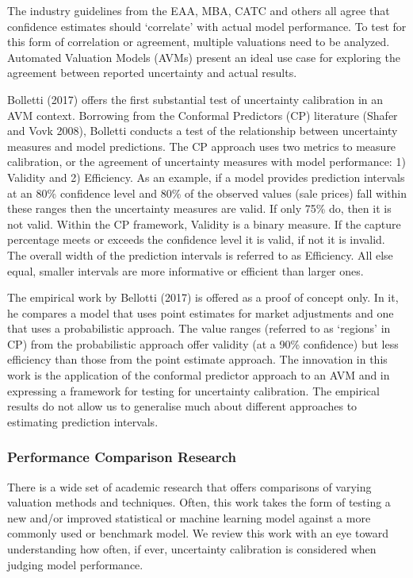 \documentclass[colTwo]{anon}
\theoremstyle{definition}
\begin{document}
The industry guidelines from the EAA, MBA, CATC and others all agree that confidence estimates should ‘correlate’ with actual model performance.  To test for this form of correlation or agreement, multiple valuations need to be analyzed.  Automated Valuation Models (AVMs) present an ideal use case for exploring the agreement between reported uncertainty and actual results.  

Bolletti (2017) offers the first substantial test of uncertainty calibration in an AVM context.  Borrowing from the Conformal Predictors (CP) literature (Shafer and Vovk 2008), Bolletti conducts a test of the relationship between uncertainty measures and model predictions. The CP approach uses two metrics to measure calibration, or the agreement of uncertainty measures with model performance: 1) Validity and 2) Efficiency.  As an example, if a model provides prediction intervals at an 80\% confidence level and 80\% of the observed values (sale prices) fall within these ranges then the uncertainty measures are valid. If only 75\% do, then it is not valid. Within the CP framework, Validity is a binary measure.  If the capture percentage meets or exceeds the confidence level it is valid, if not it is invalid. The overall width of the prediction intervals is referred to as Efficiency.  All else equal, smaller intervals are more informative or efficient than larger ones. 

The empirical work by Bellotti (2017) is offered as a proof of concept only.  In it, he compares a model that uses point estimates for market adjustments and one that uses a probabilistic approach.  The value ranges (referred to as ‘regions’ in CP) from the probabilistic approach offer validity (at a 90\% confidence) but less efficiency than those from the point estimate approach.  The innovation in this work is the application of the conformal predictor approach to an AVM and in expressing a framework for testing for uncertainty calibration.  The empirical results do not allow us to generalise much about different approaches to estimating prediction intervals.   

\subsubsection{Performance Comparison Research}

There is a wide set of academic research that offers comparisons of varying valuation methods and techniques. Often, this work takes the form of testing a new and/or improved statistical or machine learning model against a more commonly used or benchmark model.  We review this work with an eye toward understanding how often, if ever, uncertainty calibration is considered when judging model performance. 
\end{document}
